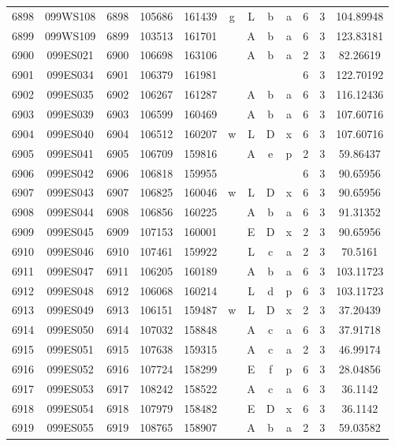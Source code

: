 \begin{tabular}{|*{12}{c|}}
6898 & 099WS108 & 6898 & 105686 & 161439 & g & L & b & a & 6 & 3 & 104.89948 \\ 
6899 & 099WS109 & 6899 & 103513 & 161701 &  & A & b & a & 6 & 3 & 123.83181 \\ 
6900 & 099ES021 & 6900 & 106698 & 163106 &  & A & b & a & 2 & 3 & 82.26619 \\ 
6901 & 099ES034 & 6901 & 106379 & 161981 &  &  &  &  & 6 & 3 & 122.70192 \\ 
6902 & 099ES035 & 6902 & 106267 & 161287 &  & A & b & a & 6 & 3 & 116.12436 \\ 
6903 & 099ES039 & 6903 & 106599 & 160469 &  & A & b & a & 6 & 3 & 107.60716 \\ 
6904 & 099ES040 & 6904 & 106512 & 160207 & w & L & D & x & 6 & 3 & 107.60716 \\ 
6905 & 099ES041 & 6905 & 106709 & 159816 &  & A & e & p & 2 & 3 & 59.86437 \\ 
6906 & 099ES042 & 6906 & 106818 & 159955 &  &  &  &  & 6 & 3 & 90.65956 \\ 
6907 & 099ES043 & 6907 & 106825 & 160046 & w & L & D & x & 6 & 3 & 90.65956 \\ 
6908 & 099ES044 & 6908 & 106856 & 160225 &  & A & b & a & 6 & 3 & 91.31352 \\ 
6909 & 099ES045 & 6909 & 107153 & 160001 &  & E & D & x & 2 & 3 & 90.65956 \\ 
6910 & 099ES046 & 6910 & 107461 & 159922 &  & L & c & a & 2 & 3 & 70.5161 \\ 
6911 & 099ES047 & 6911 & 106205 & 160189 &  & A & b & a & 6 & 3 & 103.11723 \\ 
6912 & 099ES048 & 6912 & 106068 & 160214 &  & L & d & p & 6 & 3 & 103.11723 \\ 
6913 & 099ES049 & 6913 & 106151 & 159487 & w & L & D & x & 2 & 3 & 37.20439 \\ 
6914 & 099ES050 & 6914 & 107032 & 158848 &  & A & c & a & 6 & 3 & 37.91718 \\ 
6915 & 099ES051 & 6915 & 107638 & 159315 &  & A & c & a & 2 & 3 & 46.99174 \\ 
6916 & 099ES052 & 6916 & 107724 & 158299 &  & E & f & p & 6 & 3 & 28.04856 \\ 
6917 & 099ES053 & 6917 & 108242 & 158522 &  & A & c & a & 6 & 3 & 36.1142 \\ 
6918 & 099ES054 & 6918 & 107979 & 158482 &  & E & D & x & 6 & 3 & 36.1142 \\ 
6919 & 099ES055 & 6919 & 108765 & 158907 &  & A & b & a & 2 & 3 & 59.03582 \\ 

\end{tabular}
